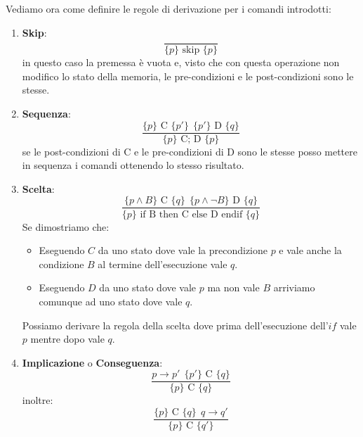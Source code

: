 Vediamo ora come definire le regole di derivazione per i comandi introdotti:
\begin{enumerate}
    \item \textbf{Skip}:
          \begin{equation}
              \frac{}{\{p\} \text{ skip } \{p\}}
          \end{equation}
          in questo caso la premessa è vuota e, visto che con questa operazione
          non modifico lo stato della memoria, le pre-condizioni e le
          post-condizioni sono le stesse.
    \item \textbf{Sequenza}:
          \begin{equation}
              \frac{\{p\} \text{ C } \{p'\} \ \ \{p'\} \text{ D } \{q\}}{\{p\}
                  \text{ C; D } \{p\}}
          \end{equation}
          se le post-condizioni di C e le pre-condizioni di D sono le stesse
          posso mettere in sequenza i comandi ottenendo lo stesso risultato.
    \item \textbf{Scelta}:
          \begin{equation}
              \frac{\{p \land B\} \text{ C } \{q\} \ \ \{p \land \lnot B\}
                  \text{ D } \{q\}}{\{p\} \text{ if B then C else D endif } \{q\}}
          \end{equation}
          Se dimostriamo che:
          \begin{itemize}
              \item Eseguendo $C$ da uno stato dove vale la precondizione $p$ e
                    vale anche la condizione $B$ al termine dell'esecuzione vale
                    $q$.
              \item Eseguendo $D$ da uno stato dove vale $p$ ma non vale $B$
                    arriviamo comunque ad uno stato dove vale $q$.
          \end{itemize}
          Possiamo derivare la regola della scelta dove prima dell'esecuzione
          dell'$if$ vale $p$ mentre dopo vale $q$.
    \item \textbf{Implicazione} o \textbf{Conseguenza}:
          \begin{equation}
              \frac{p \to p' \ \ \{p'\} \text{ C } \{q\}}{\{p\} \text{ C } \{q\}}
          \end{equation}
          inoltre:
          \begin{equation}
              \frac{\{p\} \text{ C } \{q\} \ \ q \to q'}{\{p\} \text{ C } \{q'\}}
          \end{equation}

\end{enumerate}
